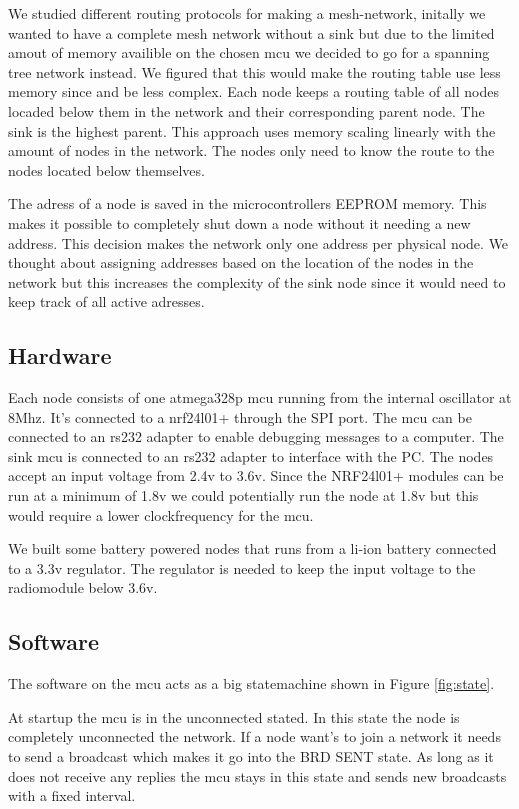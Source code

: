 \documentclass[a4paper,11pt]{article}
\begin{document}
We studied different routing protocols for making a mesh-network,
initally we wanted to have a complete mesh network without a sink but
due to the limited amout of memory availible on the chosen mcu we
decided to go for a spanning tree network instead. We figured that
this would make the routing table use less memory since and be less
complex. Each node keeps a routing table of all nodes locaded below
them in the network and their corresponding parent node. The sink is
the highest parent. This approach uses memory scaling linearly with
the amount of nodes in the network. The nodes only need to know the
route to the nodes located below themselves.

The adress of a node is saved in the microcontrollers EEPROM memory.
This makes it possible to completely shut down a node without it 
needing a new address. This decision makes the network only one 
address per physical node. We thought about assigning addresses based
on the location of the nodes in the network but this increases 
the complexity of the sink node since it would need to keep track of
all active adresses.

\subsection{Hardware}
Each node consists of one atmega328p mcu running from the
internal oscillator at 8Mhz. It's connected to a nrf24l01+ through the
SPI port. The mcu can be connected to an rs232 adapter to enable
debugging messages to a computer. The sink mcu is connected to an
rs232 adapter to interface with the PC. The nodes accept an input
voltage from 2.4v to 3.6v. Since the NRF24l01+ modules can be run at a
minimum of 1.8v we could potentially run the node at 1.8v but this
would require a lower clockfrequency for the mcu\cite{Atmega}. 

We built some battery powered nodes that runs from a li-ion battery
connected to a 3.3v regulator. The regulator is needed to keep the 
input voltage to the radiomodule below 3.6v.



\subsection{Software}
The software on the mcu acts as a big statemachine shown in Figure \ref{fig:state}.

At startup the mcu is in the unconnected stated. In this state the
node is completely unconnected the network. If a node want's to join a
network it needs to send a broadcast which makes it go into the BRD
SENT state. As long as it does not receive any replies the mcu stays
in this state and sends new broadcasts with a fixed interval.
\end{document}
